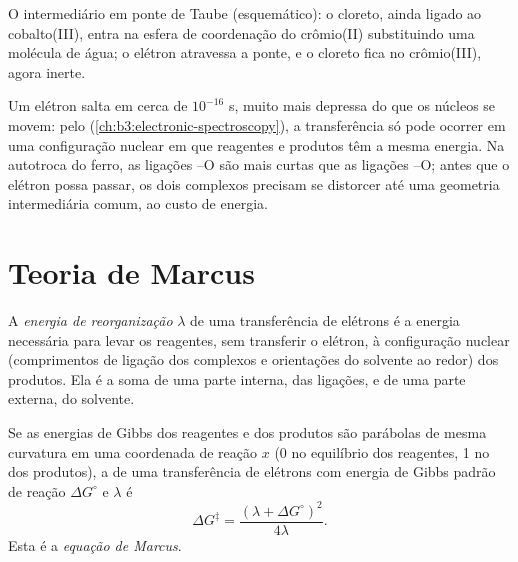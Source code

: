 \begin{omfigure}

{\small O intermediário em ponte de Taube (esquemático): o cloreto, ainda ligado ao
cobalto(III), entra na esfera de coordenação do crômio(II) substituindo uma molécula
de água; o elétron atravessa a ponte, e o cloreto fica no
crômio(III), agora inerte.}
\end{omfigure}

Um elétron salta em cerca de $10^{-16}$ s, muito mais depressa do que os núcleos se movem: pelo
 (\cref{ch:b3:electronic-spectroscopy}), a transferência
só pode ocorrer em uma configuração nuclear em que reagentes e produtos têm
a mesma energia. Na autotroca do ferro, as ligações --O são mais curtas que
as ligações --O; antes que o elétron possa passar, os dois complexos precisam se distorcer até
uma geometria intermediária comum, ao custo de energia.

\section{Teoria de Marcus}

\begin{definition}\label{def:b3:complex-mechanisms:reorganisation}
A \emph{energia de reorganização} $\lambda$ de uma
transferência de elétrons é a energia necessária para levar os reagentes, sem
transferir o elétron, à configuração nuclear (comprimentos de ligação dos
complexos e orientações do solvente ao redor) dos produtos. Ela é a
soma de uma parte interna, das ligações, e de uma parte externa, do solvente.
\end{definition}

\begin{theorem}\label{thm:b3:complex-mechanisms:marcus}
Se as energias de Gibbs dos reagentes e dos produtos são parábolas de mesma
curvatura em uma coordenada de reação $x$ (0 no equilíbrio dos reagentes, 1 no dos
produtos), a  de uma transferência de elétrons com
energia de Gibbs padrão de reação $\Delta G^\circ$ e  $\lambda$ é
\[
  \Delta G^{\ddagger} = \frac{(\lambda + \Delta G^\circ)^2}{4\lambda} .
\]
Esta é a \emph{equação de Marcus}.
\end{theorem}

